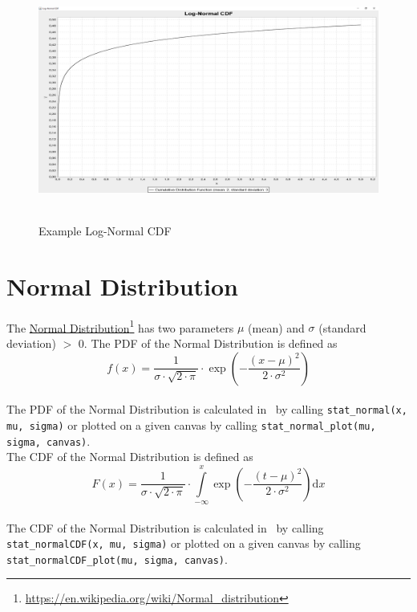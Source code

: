 		\begin{figure}[H]
			\centering
			\includegraphics[width=1\textwidth]{Figures/implemented_functions/log_normal_cdf}~\\
			\caption{Example Log-Normal CDF}
			\label{fig:log_normal_cdf}
		\end{figure}


	\section{Normal Distribution}
	
		The \href{https://en.wikipedia.org/wiki/Normal_distribution}{Normal Distribution}\footnote{\url{https://en.wikipedia.org/wiki/Normal_distribution}} has two parameters $\mu$ (mean) and $\sigma$ (standard deviation) $>$ 0. The \ac{PDF} of the Normal Distribution is defined as
		\\[0.3cm]
		$$f(x) = \frac{1}{\sigma \cdot \sqrt{2 \cdot \pi}} \cdot \exp\left(-\frac{(x-\mu)^2}{2 \cdot \sigma^2}\right)$$
		\\[0.3cm]
		The \ac{PDF} of the Normal Distribution is calculated in \setlx\ by calling \lstinline{stat_normal(x, mu, sigma)} or plotted on a given canvas by calling \lstinline{stat_normal_plot(mu, sigma, canvas)}.
		\\[0.3cm]
		The \ac{CDF} of the Normal Distribution is defined as
		\\[0.3cm]
		$$F(x) = \frac{1}{\sigma \cdot \sqrt{2 \cdot \pi}} \cdot 
			\int\limits_{-\infty}^x \exp\left(-\frac{(t-\mu)^2}{2 \cdot \sigma^2}\right) \mathrm{d}x$$
		\\[0.3cm]
		The \ac{CDF} of the Normal Distribution is calculated in \setlx\ by calling \lstinline{stat_normalCDF(x, mu, sigma)} or plotted on a given canvas by calling \lstinline{stat_normalCDF_plot(mu, sigma, canvas)}.

